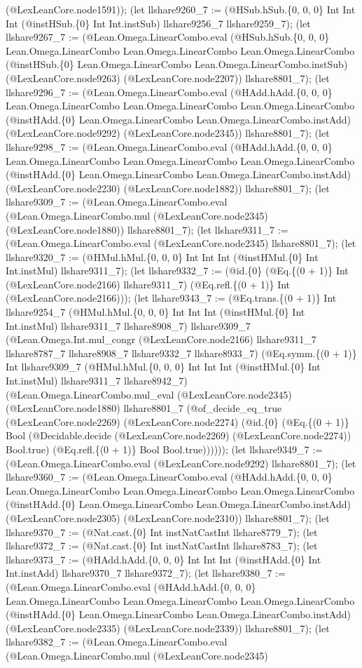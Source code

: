 \documentclass[11pt]{article}
\begin{document}
(@LexLeanCore.node1591)); (let llshare9260\_7 := (@HSub.hSub.\{0, 0, 0\} Int Int Int (@instHSub.\{0\} Int Int.instSub) llshare9256\_7 llshare9259\_7); (let llshare9267\_7 := (@Lean.Omega.LinearCombo.eval (@HSub.hSub.\{0, 0, 0\} Lean.Omega.LinearCombo Lean.Omega.LinearCombo Lean.Omega.LinearCombo (@instHSub.\{0\} Lean.Omega.LinearCombo Lean.Omega.LinearCombo.instSub) (@LexLeanCore.node9263) (@LexLeanCore.node2207)) llshare8801\_7); (let llshare9296\_7 := (@Lean.Omega.LinearCombo.eval (@HAdd.hAdd.\{0, 0, 0\} Lean.Omega.LinearCombo Lean.Omega.LinearCombo Lean.Omega.LinearCombo (@instHAdd.\{0\} Lean.Omega.LinearCombo Lean.Omega.LinearCombo.instAdd) (@LexLeanCore.node9292) (@LexLeanCore.node2345)) llshare8801\_7); (let llshare9298\_7 := (@Lean.Omega.LinearCombo.eval (@HAdd.hAdd.\{0, 0, 0\} Lean.Omega.LinearCombo Lean.Omega.LinearCombo Lean.Omega.LinearCombo (@instHAdd.\{0\} Lean.Omega.LinearCombo Lean.Omega.LinearCombo.instAdd) (@LexLeanCore.node2230) (@LexLeanCore.node1882)) llshare8801\_7); (let llshare9309\_7 := (@Lean.Omega.LinearCombo.eval (@Lean.Omega.LinearCombo.mul (@LexLeanCore.node2345) (@LexLeanCore.node1880)) llshare8801\_7); (let llshare9311\_7 := (@Lean.Omega.LinearCombo.eval (@LexLeanCore.node2345) llshare8801\_7); (let llshare9320\_7 := (@HMul.hMul.\{0, 0, 0\} Int Int Int (@instHMul.\{0\} Int Int.instMul) llshare9311\_7); (let llshare9332\_7 := (@id.\{0\} (@Eq.\{(0 + 1)\} Int (@LexLeanCore.node2166) llshare9311\_7) (@Eq.refl.\{(0 + 1)\} Int (@LexLeanCore.node2166))); (let llshare9343\_7 := (@Eq.trans.\{(0 + 1)\} Int llshare9254\_7 (@HMul.hMul.\{0, 0, 0\} Int Int Int (@instHMul.\{0\} Int Int.instMul) llshare9311\_7 llshare8908\_7) llshare9309\_7 (@Lean.Omega.Int.mul\_congr (@LexLeanCore.node2166) llshare9311\_7 llshare8787\_7 llshare8908\_7 llshare9332\_7 llshare8933\_7) (@Eq.symm.\{(0 + 1)\} Int llshare9309\_7 (@HMul.hMul.\{0, 0, 0\} Int Int Int (@instHMul.\{0\} Int Int.instMul) llshare9311\_7 llshare8942\_7) (@Lean.Omega.LinearCombo.mul\_eval (@LexLeanCore.node2345) (@LexLeanCore.node1880) llshare8801\_7 (@of\_decide\_eq\_true (@LexLeanCore.node2269) (@LexLeanCore.node2274) (@id.\{0\} (@Eq.\{(0 + 1)\} Bool (@Decidable.decide (@LexLeanCore.node2269) (@LexLeanCore.node2274)) Bool.true) (@Eq.refl.\{(0 + 1)\} Bool Bool.true)))))); (let llshare9349\_7 := (@Lean.Omega.LinearCombo.eval (@LexLeanCore.node9292) llshare8801\_7); (let llshare9360\_7 := (@Lean.Omega.LinearCombo.eval (@HAdd.hAdd.\{0, 0, 0\} Lean.Omega.LinearCombo Lean.Omega.LinearCombo Lean.Omega.LinearCombo (@instHAdd.\{0\} Lean.Omega.LinearCombo Lean.Omega.LinearCombo.instAdd) (@LexLeanCore.node2305) (@LexLeanCore.node2310)) llshare8801\_7); (let llshare9370\_7 := (@Nat.cast.\{0\} Int instNatCastInt llshare8779\_7); (let llshare9372\_7 := (@Nat.cast.\{0\} Int instNatCastInt llshare8783\_7); (let llshare9373\_7 := (@HAdd.hAdd.\{0, 0, 0\} Int Int Int (@instHAdd.\{0\} Int Int.instAdd) llshare9370\_7 llshare9372\_7); (let llshare9380\_7 := (@Lean.Omega.LinearCombo.eval (@HAdd.hAdd.\{0, 0, 0\} Lean.Omega.LinearCombo Lean.Omega.LinearCombo Lean.Omega.LinearCombo (@instHAdd.\{0\} Lean.Omega.LinearCombo Lean.Omega.LinearCombo.instAdd) (@LexLeanCore.node2335) (@LexLeanCore.node2339)) llshare8801\_7); (let llshare9382\_7 := (@Lean.Omega.LinearCombo.eval (@Lean.Omega.LinearCombo.mul (@LexLeanCore.node2345) 
\end{document}
